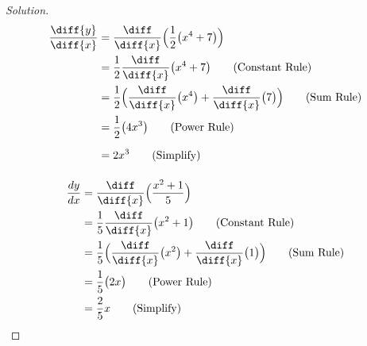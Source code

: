 \documentclass[crop=false,class=article,oneside]{standalone}
\begin{document}
            \begin{proof}[Solution]
                \par\hfill\par
                \begin{minipage}[b]{.49\textwidth}
                    \centering
                    \begin{align*}
                        \frac{\diff{y}}{\diff{x}}
                        &=\frac{\diff}{\diff{x}}\Big(
                            \frac{1}{2}\big(x^{4}+7\big)
                        \Big)\\
                        &=\frac{1}{2}\frac{\diff}{\diff{x}}
                            \big(x^{4}+7\big)
                        \tag{Constant Rule}\\
                        &=\frac{1}{2}\Big(
                            \frac{\diff}{\diff{x}}
                            \big(x^{4}\big)+
                            \frac{\diff}{\diff{x}}
                            \big(7\big)
                        \Big)
                        \vphantom{\frac{\diff}{\diff}}
                        \tag{Sum Rule}\\
                        &=\frac{1}{2}\big(4x^{3}\big)
                        \vphantom{\frac{\diff}{\diff}}
                        \tag{Power Rule}\\
                        &=2x^{3}
                        \vphantom{\frac{\diff}{\diff}}
                        \tag{Simplify}
                    \end{align*}
                \end{minipage}
                \hfill
                \vline
                \begin{minipage}[b]{.49\textwidth}
                    \centering
                    \begin{align*}
                        \frac{dy}{dx}
                        &=\frac{\diff}{\diff{x}}
                            \Big(\frac{x^{2}+1}{5}\Big)\\
                        &=\frac{1}{5}\frac{\diff}{\diff{x}}
                            \big(x^{2}+1\big)
                        \tag{Constant Rule}\\
                        &=\frac{1}{5}\Big(
                            \frac{\diff}{\diff{x}}
                            \big(x^{2}\big)+
                            \frac{\diff}{\diff{x}}
                            \big(1\big)
                        \Big)
                        \tag{Sum Rule}\\
                        &=\frac{1}{5}\big(2x\big)
                        \tag{Power Rule}\\
                        &=\frac{2}{5}x
                        \tag{Simplify}
                    \end{align*}
                \end{minipage}
            \end{proof}
\end{document}
